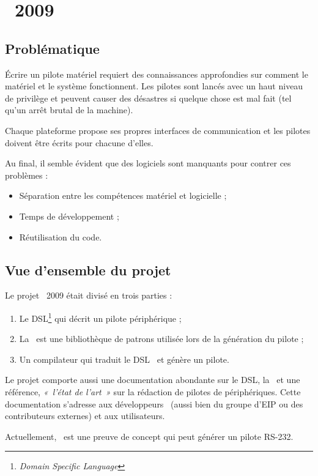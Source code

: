 \documentclass{rtxreport}
\begin{document}
\chapter{\rtx\ 2009}

\section{Problématique}

Écrire un pilote matériel requiert des connaissances approfondies sur comment le
matériel et le système fonctionnent. Les pilotes sont lancés avec un haut niveau
de privilège et peuvent causer des désastres si quelque chose est mal fait
(tel qu'un arrêt brutal de la machine).

Chaque plateforme propose ses propres interfaces de communication et les
pilotes doivent être écrits pour chacune d'elles.

Au final, il semble évident que des logiciels sont manquants pour contrer ces
problèmes :
\begin{itemize}
\item Séparation entre les compétences matériel et logicielle ;
\item Temps de développement ;
\item Réutilisation du code.
\end{itemize}

\section{Vue d'ensemble du projet}

Le projet \rtx\ 2009 était divisé en trois parties :
\begin{enumerate}
\item Le DSL\footnote{\emph{Domain Specific Language}} qui décrit un pilote
périphérique ;
\item La \BL\ est une bibliothèque de patrons utilisée lors de la génération
du pilote ;
\item Un compilateur qui traduit le DSL \rtx\ et génère un pilote.
\end{enumerate}

Le projet comporte aussi une documentation abondante sur le DSL, la \BL\ et une
référence, \emph{«~l'état de l'art~»} sur la rédaction de pilotes de
périphériques. Cette documentation s'adresse aux développeurs \rtx\ (aussi bien
du groupe d'EIP ou des contributeurs externes) et aux utilisateurs.

Actuellement, \rtx\ est une preuve de concept qui peut générer un pilote RS-232.
\end{document}
